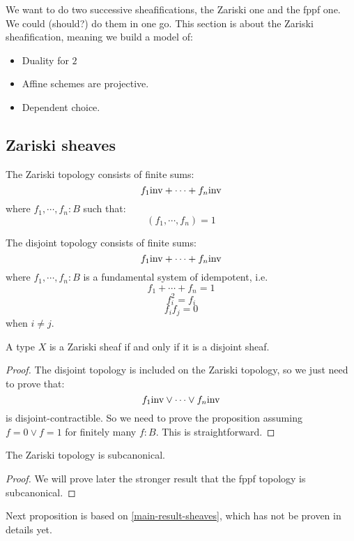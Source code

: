 We want to do two successive sheafifications, the Zariski one and the fppf one. We could (should?) do them in one go. This section is about the Zariski sheafification, meaning we build a model of:

\begin{itemize}
\item Duality for $2$
\item Affine schemes are projective.
\item Dependent choice.
\end{itemize}


\subsection{Zariski sheaves}

\begin{definition}
The Zariski topology consists of finite sums:
\[f_1 \mathrm{inv} + \cdots + f_n \mathrm{inv}\]
where $f_1,\cdots,f_n:B$ such that:
\[(f_1,\cdots,f_n) = 1\]
\end{definition}

\begin{definition}
The disjoint topology consists of finite sums:
\[f_1 \mathrm{inv} + \cdots + f_n \mathrm{inv}\]
where $f_1,\cdots,f_n:B$ is a fundamental system of idempotent, i.e.
\[f_1+\cdots+f_n = 1\]
\[f_i^2 = f_i\]
\[f_if_j = 0\]
when $i\not=j$.
\end{definition}

\begin{lemma}
A type $X$ is a Zariski sheaf if and only if it is a disjoint sheaf.
\end{lemma}

\begin{proof}
The disjoint topology is included on the Zariski topology, so we just need to prove that:
\[f_1 \mathrm{inv} \lor \cdots \lor f_n \mathrm{inv}\]
is disjoint-contractible. So we need to prove the proposition assuming $f=0\lor f=1$ for finitely many $f:B$. This is straightforward.
\end{proof}

\begin{lemma}
The Zariski topology is subcanonical.
\end{lemma}

\begin{proof}
We will prove later the stronger result that the fppf topology is subcanonical.
\end{proof}

Next proposition is based on \cref{main-result-sheaves}, which has not be proven in details yet.

